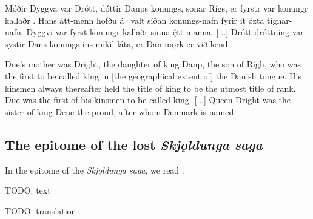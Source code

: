 \bpg\bpa[0]%
Móðir Dyggva var Drótt, dóttir Danps konungs, sonar Rígs, er fyrstr var konungr kallaðr .  Hans átt-menn hǫfðu á·valt síðan konungs-nafn fyrir it ǿzta tígnar-nafn.  Dyggvi var fyrst konungr kallaðr sinna ę́tt-manna. [...] Drótt dróttning var systir Dans konungs ins mikil-láta, er Dan-mǫrk er við kend.\epa

\bpb Due’s mother was Dright, the daughter of king Danp, the son of Righ, who was the first to be called king in [the geographical extent of] the Danish tongue.  His kinsmen always thereafter held the title of king to be the utmost title of rank.  Due was the first of his kinsmen to be called king. [...] Queen Dright was the sister of king Dene the proud, after whom Denmark is named.\epb\epg

\subsection{The epitome of the lost \emph{Skjǫldunga saga}}

In the epitome of the \emph{Skjǫldunga saga}, we read \parencite[1--45]{Bjarni1982}:

\bpg\bpa[0]%
TODO: text\epa

\bpb TODO: translation\epb\epg

\sectionline
